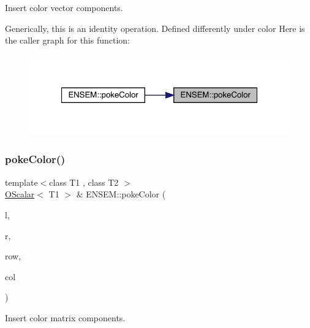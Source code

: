 Insert color vector components. 

Generically, this is an identity operation. Defined differently under color Here is the caller graph for this function\+:\nopagebreak
\begin{figure}[H]
\begin{center}
\leavevmode
\includegraphics[width=321pt]{d1/d71/group__obsscalar_ga0a369092bcae6deacc6b6a1a5177ddb1_icgraph}
\end{center}
\end{figure}
\mbox{\label{group__obsscalar_ga9271cf018f5c0e5f74f6b065b68f91b9}} 
\subsubsection{\texorpdfstring{pokeColor()}{pokeColor()}\hspace{0.1cm}{\footnotesize\ttfamily [2/2]}}
{\footnotesize\ttfamily template$<$class T1 , class T2 $>$ \\
\mbox{\hyperlink{classENSEM_1_1OScalar}{O\+Scalar}}$<$ T1 $>$ \& E\+N\+S\+E\+M\+::poke\+Color (\begin{DoxyParamCaption}\item[{\mbox{\hyperlink{classENSEM_1_1OScalar}{O\+Scalar}}$<$ T1 $>$ \&}]{l,  }\item[{const \mbox{\hyperlink{classENSEM_1_1OScalar}{O\+Scalar}}$<$ T2 $>$ \&}]{r,  }\item[{int}]{row,  }\item[{int}]{col }\end{DoxyParamCaption})\hspace{0.3cm}{\ttfamily [inline]}}



Insert color matrix components. 

